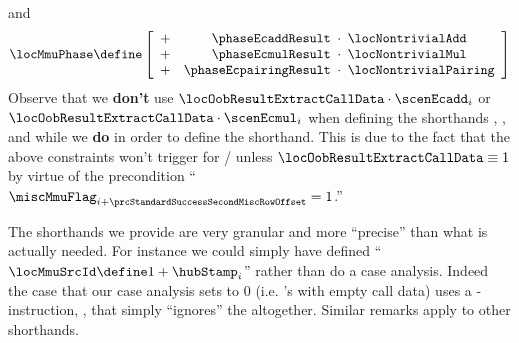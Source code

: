 \begin{description}
\begin{description}
				and
				\[
					\locMmuPhase \define
					\left[ \begin{array}{crclcl}
						+ & \phaseEcaddResult     & \!\!\!\cdot\!\!\! & \locNontrivialAdd     \\
						+ & \phaseEcmulResult     & \!\!\!\cdot\!\!\! & \locNontrivialMul     \\
						+ & \phaseEcpairingResult & \!\!\!\cdot\!\!\! & \locNontrivialPairing \\
					\end{array} \right]
				\]
				\saNote{} Observe that we \textbf{don't} use
				$\locOobResultExtractCallData \cdot \scenEcadd _{i}$ or
				$\locOobResultExtractCallData \cdot \scenEcmul _{i}$
				when defining the shorthands 
				\locMmuInst{},
				\locMmuSize{},
				\locMmuExoSum{} and
				\locMmuPhase{} while we \textbf{do} in order to define the \locTriggerMmu{} shorthand.
				This is due to the fact that the above constraints won't trigger for  /  unless $\locOobResultExtractCallData \equiv 1$ by virtue of the precondition
				``\If $\miscMmuFlag_{i + \prcStandardSuccessSecondMiscRowOffset} = 1$.''

				\saNote{} The shorthands we provide are very granular and more ``precise'' than what is actually needed.
				For instance we could simply have defined ``$\locMmuSrcId \define 1 + \hubStamp_{i}$'' rather than do a case analysis.
				Indeed the case that our case analysis sets to $0$ (i.e. 's with empty call data) uses a \mmuMod{}-instruction, \mmuInstMstore{}, that simply ``ignores'' the \miscMmuSrcId{} altogether. Similar remarks apply to other shorthands.


\end{description}
\end{description}
